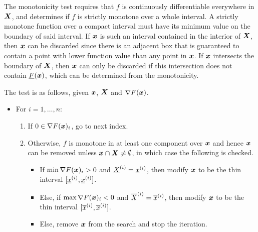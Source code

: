 \documentclass[../global-optimization.tex]{subfiles}
\begin{document}
  The monotonicity test requires that $f$ is 
  continuously differentiable everywhere in $\X$, and 
  determines if $f$ is strictly monotone over a whole interval.
  A strictly monotone function over a compact interval 
  must have its minimum value on the boundary of said interval.
  If $\x$ is such an interval contained in the interior of $\X$, 
  then $\x$ can be discarded since there is an adjacent box that is 
  guaranteed to contain a point with lower function value than any point in $\x$.
  If $\x$ intersects the boundary of $\X$, 
  then $\x$ can only be discarded if this intersection 
  does not contain $\ul F(\x)$, which can be determined from the monotonicity.

  The test is as follows, given $\x$, $\X$ and $\nabla F(\x)$.

  \begin{itemize}
    \item For $i = 1,\dots,n$:
    \begin{enumerate}
      \item If $0 \in \nabla F(\x)_i$, go to next index.
      \item Otherwise, $f$ is monotone in at least one component over $\x$ and 
      hence $\x$ can be removed unless $\x \cap \X \neq \emptyset$, 
      in which case the following is checked.
      \begin{itemize}
        \item If $\min \nabla F(\x)_i > 0$ and $\underline X ^{(i)} = \underline x ^{(i)}$, then modify $\x$ to be the thin interval $[\underline x ^{(i)}, \underline x ^{(i)}]$.
        \item Else, if $\max \nabla F(\x)_i < 0$ and $\overline X ^{(i)} = \overline x ^{(i)}$, then modify $\x$ to be the thin interval $[\overline x ^{(i)}, \overline x ^{(i)}]$.
        \item Else, remove $\x$ from the search and stop the iteration.
      \end{itemize}
    \end{enumerate}
  \end{itemize}
\end{document}
